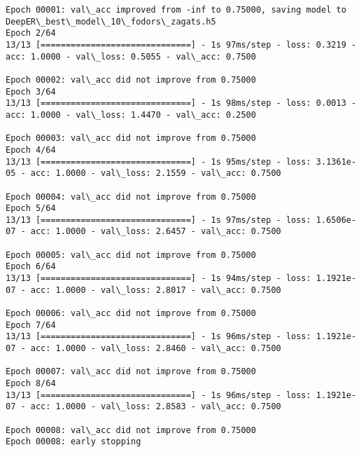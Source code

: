 \documentclass[11pt]{article}
\begin{document}
\begin{Verbatim}[commandchars=\\\{\}]
Epoch 00001: val\_acc improved from -inf to 0.75000, saving model to DeepER\_best\_model\_10\_fodors\_zagats.h5
Epoch 2/64
13/13 [==============================] - 1s 97ms/step - loss: 0.3219 - acc: 1.0000 - val\_loss: 0.5055 - val\_acc: 0.7500

Epoch 00002: val\_acc did not improve from 0.75000
Epoch 3/64
13/13 [==============================] - 1s 98ms/step - loss: 0.0013 - acc: 1.0000 - val\_loss: 1.4470 - val\_acc: 0.2500

Epoch 00003: val\_acc did not improve from 0.75000
Epoch 4/64
13/13 [==============================] - 1s 95ms/step - loss: 3.1361e-05 - acc: 1.0000 - val\_loss: 2.1559 - val\_acc: 0.7500

Epoch 00004: val\_acc did not improve from 0.75000
Epoch 5/64
13/13 [==============================] - 1s 97ms/step - loss: 1.6506e-07 - acc: 1.0000 - val\_loss: 2.6457 - val\_acc: 0.7500

Epoch 00005: val\_acc did not improve from 0.75000
Epoch 6/64
13/13 [==============================] - 1s 94ms/step - loss: 1.1921e-07 - acc: 1.0000 - val\_loss: 2.8017 - val\_acc: 0.7500

Epoch 00006: val\_acc did not improve from 0.75000
Epoch 7/64
13/13 [==============================] - 1s 96ms/step - loss: 1.1921e-07 - acc: 1.0000 - val\_loss: 2.8460 - val\_acc: 0.7500

Epoch 00007: val\_acc did not improve from 0.75000
Epoch 8/64
13/13 [==============================] - 1s 96ms/step - loss: 1.1921e-07 - acc: 1.0000 - val\_loss: 2.8583 - val\_acc: 0.7500

Epoch 00008: val\_acc did not improve from 0.75000
Epoch 00008: early stopping


\end{Verbatim}
\end{document}
